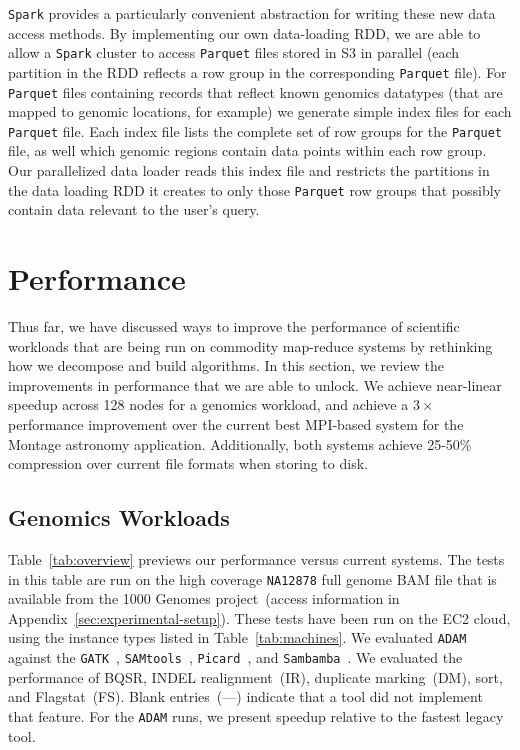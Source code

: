 \documentclass{sig-alternate}
\begin{document}
\texttt{Spark} provides a particularly convenient abstraction for writing these new data access methods.  By
implementing our own data-loading RDD, we are able to allow a \texttt{Spark} cluster to access \texttt{Parquet} files
stored in S3 in parallel (each partition in the RDD reflects a row group in the corresponding \texttt{Parquet} file).
For \texttt{Parquet} files containing records that reflect known genomics datatypes (that are mapped to genomic
locations, for example) we generate simple index files for each \texttt{Parquet} file.  Each index file lists the
complete set of row groups for the \texttt{Parquet} file, as well which genomic regions contain data points within
each row group.  Our parallelized data loader reads this index file and restricts the partitions in the data
loading RDD it creates to only those \texttt{Parquet} row groups that possibly contain data relevant to the
user's query.

\section{Performance}
\label{sec:performance}

Thus far, we have discussed ways to improve the performance of scientific workloads that are
being run on commodity map-reduce systems by rethinking how we decompose and build algorithms.
In this section, we review the improvements in performance that we are able to unlock. We achieve
near-linear speedup across 128 nodes for a genomics workload, and achieve a $3\times$ performance
improvement over the current best MPI-based system for the Montage astronomy application.
Additionally, both systems achieve 25-50\% compression over current file formats when storing to disk.

\subsection{Genomics Workloads}
\label{sec:genomics-performance}

Table~\ref{tab:overview} previews our performance versus current systems. The tests in this table are run on the
high coverage \texttt{NA12878} full genome BAM file that is available from the 1000 Genomes
project~(access information in Appendix~\ref{sec:experimental-setup}). These tests have been run on the EC2 cloud,
using the instance types listed in
Table~\ref{tab:machines}. We evaluated \texttt{ADAM} against the \texttt{GATK}~\cite{depristo11},
\texttt{SAMtools}~\cite{li11}, \texttt{Picard}~\cite{picard}, and \texttt{Sambamba}~\cite{tarasov15}. We evaluated
the performance of BQSR, INDEL realignment~(IR), duplicate marking~(DM), sort, and Flagstat~(FS). Blank
entries~(---) indicate that a tool did not implement that feature. For the \texttt{ADAM} runs, we present
speedup relative to the fastest legacy tool.
\end{document}
